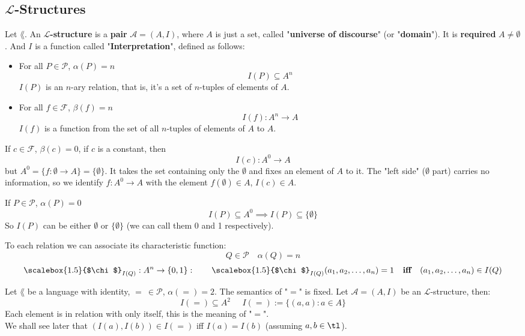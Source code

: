 \subsection{$\mathcal{L}$-Structures}
Let $\lang$. An \textbf{$\mathcal{L}$-structure} is a \textbf{pair} $\mathcal{A} = (A, I)$, where $A$ is just a set, called "\textbf{universe of discourse}" (or "\textbf{domain}"). It is \textbf{required} $A \neq \emptyset$. And $I$ is a function called "\textbf{Interpretation}", defined as follows:
\begin{itemize}
	\item For all $P \in \mathcal{P}$, $\alpha (P) = n$
	$$ I(P) \subseteq A^n $$
	$I(P)$ is an $n$-ary relation, that is, it's a set of $n$-tuples of elements of $A$.\\

	\item For all $f \in \mathcal{F}$, $\beta(f) = n$
	$$ I(f):  A^n \rightarrow A $$
	$I(f)$ is a function from the set of all $n$-tuples of elements of $A$ to $A$.\\
\end{itemize}

\begin{remark}
	If $c \in \mathcal{F}$, $\beta (c) = 0$, if $c$ is a constant, then
	$$ I(c) : A^0 \rightarrow A$$
	but $A^0 = \{f: \emptyset \rightarrow A \} = \{\emptyset\}$. It takes the set containing only the $\emptyset$ and fixes an element of $A$ to it. The "left side" ($\emptyset$ part) carries no information, so we identify $f:A^0 \rightarrow A$ with the element $f(\emptyset) \in A$, $I(c) \in A$.
\end{remark}

\begin{remark}
	If $P \in \mathcal{P}$, $\alpha (P) = 0$
	$$ I(P) \subseteq A^0 \implies I(P) \subseteq \{\emptyset\}$$
	So $I(P)$ can be either $\emptyset$ or $\{\emptyset\}$ (we can call them 0 and 1 respectively).
\end{remark}

\begin{remark}
  	To each relation we can associate its characteristic function:
	$$ Q \in \mathcal{P} \quad \alpha(Q) = n$$
	$$ \scalebox{1.5}{$\chi$}_{I(Q)} : A^n \rightarrow \{0,1\} : \qquad \scalebox{1.5}{$\chi$}_{I(Q)}(a_1,a_2, \dots, a_n) = 1 \ \ \textbf{ iff } \ \ (a_1,a_2, \dots, a_n) \in I(Q)  $$
\end{remark}

\begin{remark}
	Let $\lang$ be a language with identity, $= \ \in \mathcal{P}$, $\alpha(=) = 2$. The semantics of "$=$" is fixed. Let $\mathcal{A} = (A,I)$ be an $\mathcal{L}$-structure, then:
	$$ I (=) \subseteq A^2 \;\;\;\;\; I (=) := \{ (a,a): a \in A\} $$
	Each element is in relation with only itself, this is the meaning of "$=$".\\
	We shall see later that $(I(a), I(b)) \in I(=)$ iff $I(a) = I(b)$ (assuming $a,b \in \tl$).\\
\end{remark}

